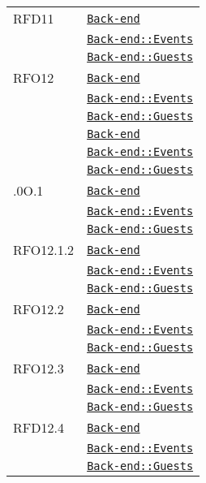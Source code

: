\begin{longtable}{|>{\centering}m{3cm}|m{10cm}<{\centering}|}
RFD11 & \hyperref[Back-end]{\texttt{Back-end}}\\
& \hyperref[Back-end::Events]{\texttt{Back-end::Events}}\\
& \hyperref[Back-end::Guests]{\texttt{Back-end::Guests}}\\ \hline

RFO12 & \hyperref[Back-end]{\texttt{Back-end}}\\
& \hyperref[Back-end::Events]{\texttt{Back-end::Events}}\\
& \hyperref[Back-end::Guests]{\texttt{Back-end::Guests}}\\ \hline

 & \hyperref[Back-end]{\texttt{Back-end}}\\
& \hyperref[Back-end::Events]{\texttt{Back-end::Events}}\\
& \hyperref[Back-end::Guests]{\texttt{Back-end::Guests}}\\ \hline

.0O.1 & \hyperref[Back-end]{\texttt{Back-end}}\\
& \hyperref[Back-end::Events]{\texttt{Back-end::Events}}\\
& \hyperref[Back-end::Guests]{\texttt{Back-end::Guests}}\\ \hline

RFO12.1.2 & \hyperref[Back-end]{\texttt{Back-end}}\\
& \hyperref[Back-end::Events]{\texttt{Back-end::Events}}\\
& \hyperref[Back-end::Guests]{\texttt{Back-end::Guests}}\\ \hline

RFO12.2 & \hyperref[Back-end]{\texttt{Back-end}}\\
& \hyperref[Back-end::Events]{\texttt{Back-end::Events}}\\
& \hyperref[Back-end::Guests]{\texttt{Back-end::Guests}}\\ \hline

RFO12.3 & \hyperref[Back-end]{\texttt{Back-end}}\\
& \hyperref[Back-end::Events]{\texttt{Back-end::Events}}\\
& \hyperref[Back-end::Guests]{\texttt{Back-end::Guests}}\\ \hline

RFD12.4 & \hyperref[Back-end]{\texttt{Back-end}}\\
& \hyperref[Back-end::Events]{\texttt{Back-end::Events}}\\
& \hyperref[Back-end::Guests]{\texttt{Back-end::Guests}}\\ \hline


\end{longtable}
